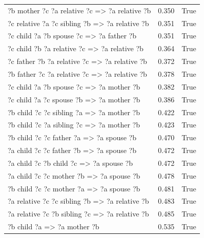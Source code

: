 \begin{longtable}{lrl}
  ?b  mother  ?c  ?a  relative  ?c   => ?a  relative  ?b &           0.350 &                     True \\
 ?c  relative  ?a  ?c  sibling  ?b   => ?a  relative  ?b &           0.351 &                     True \\
       ?c  child  ?a  ?b  spouse  ?c   => ?a  father  ?b &           0.351 &                     True \\
   ?c  child  ?b  ?a  relative  ?c   => ?a  relative  ?b &           0.364 &                     True \\
  ?c  father  ?b  ?a  relative  ?c   => ?a  relative  ?b &           0.372 &                     True \\
  ?b  father  ?c  ?a  relative  ?c   => ?a  relative  ?b &           0.378 &                     True \\
       ?c  child  ?a  ?b  spouse  ?c   => ?a  mother  ?b &           0.382 &                     True \\
       ?c  child  ?a  ?c  spouse  ?b   => ?a  mother  ?b &           0.386 &                     True \\
      ?b  child  ?c  ?c  sibling  ?a   => ?a  mother  ?b &           0.422 &                     True \\
      ?b  child  ?c  ?a  sibling  ?c   => ?a  mother  ?b &           0.423 &                     True \\
       ?b  child  ?c  ?c  father  ?a   => ?a  spouse  ?b &           0.470 &                     True \\
       ?a  child  ?c  ?c  father  ?b   => ?a  spouse  ?b &           0.472 &                     True \\
        ?a  child  ?c  ?b  child  ?c   => ?a  spouse  ?b &           0.472 &                     True \\
       ?a  child  ?c  ?c  mother  ?b   => ?a  spouse  ?b &           0.478 &                     True \\
       ?b  child  ?c  ?c  mother  ?a   => ?a  spouse  ?b &           0.481 &                     True \\
 ?a  relative  ?c  ?c  sibling  ?b   => ?a  relative  ?b &           0.483 &                     True \\
 ?a  relative  ?c  ?b  sibling  ?c   => ?a  relative  ?b &           0.485 &                     True \\
                       ?b  child  ?a   => ?a  mother  ?b &           0.535 &                     True \\

\end{longtable}
